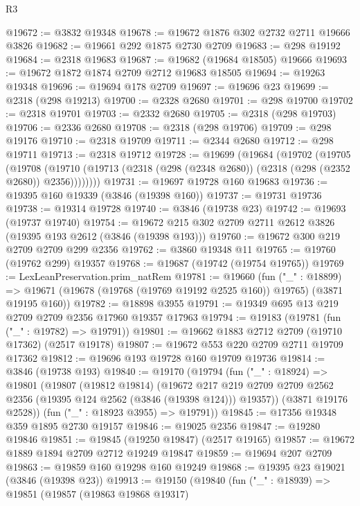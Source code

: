 \begin{lexlean}{R3}
\begin{coremodule}
@19672 := @3832 @19348
@19678 := @19672 @1876 @302 @2732 @2711 @19666 @3826
@19682 := @19661 @292 @1875 @2730 @2709
@19683 := @298 @19192
@19684 := @2318 @19683
@19687 := @19682 (@19684 @18505) @19666
@19693 := @19672 @1872 @1874 @2709 @2712 @19683 @18505
@19694 := @19263 @19348
@19696 := @19694 @178 @2709
@19697 := @19696 @23
@19699 := @2318 (@298 @19213)
@19700 := @2328 @2680
@19701 := @298 @19700
@19702 := @2318 @19701
@19703 := @2332 @2680
@19705 := @2318 (@298 @19703)
@19706 := @2336 @2680
@19708 := @2318 (@298 @19706)
@19709 := @298 @19176
@19710 := @2318 @19709
@19711 := @2344 @2680
@19712 := @298 @19711
@19713 := @2318 @19712
@19728 := @19699
    (@19684
      (@19702
        (@19705
          (@19708
            (@19710 (@19713 (@2318 (@298 (@2348 @2680)) (@2318 (@298 (@2352 @2680)) @2356))))))))
@19731 := @19697 @19728 @160 @19683
@19736 := @19395 @160 @19339 (@3846 (@19398 @160))
@19737 := @19731 @19736
@19738 := @19314 @19728
@19740 := @3846 (@19738 @23)
@19742 := @19693 (@19737 @19740)
@19754 := @19672 @215 @302 @2709 @2711 @2612 @3826 (@19395 @193 @2612 (@3846 (@19398 @193)))
@19760 := @19672 @300 @219 @2709 @2709 @299 @2356
@19762 := @3860 @19348 @11
@19765 := @19760 (@19762 @299) @19357
@19768 := @19687 (@19742 (@19754 @19765))
@19769 := LexLeanPreservation.prim_natRem
@19781 := @19660
    (fun ("_" : @18899) =>
    @19671 (@19678 (@19768 (@19769 @19192 @2525 @160)) @19765) (@3871 @19195 @160))
@19782 := @18898 @3955
@19791 := @19349 @695 @13 @219 @2709 @2709 @2356 @17960 @19357 @17963
@19794 := @19183 (@19781 (fun ("_" : @19782) => @19791))
@19801 := @19662 @1883 @2712 @2709 (@19710 @17362) (@2517 @19178)
@19807 := @19672 @553 @220 @2709 @2711 @19709 @17362
@19812 := @19696 @193 @19728 @160 @19709 @19736
@19814 := @3846 (@19738 @193)
@19840 := @19170
    (@19794
      (fun ("_" : @18924) =>
      @19801
        (@19807
          (@19812 @19814)
          (@19672
            @217
            @219
            @2709
            @2709
            @2562
            @2356
            (@19395 @124 @2562 (@3846 (@19398 @124)))
            @19357))
        (@3871 @19176 @2528))
      (fun ("_" : @18923 @3955) => @19791))
@19845 := @17356 @19348 @359 @1895 @2730 @19157
@19846 := @19025 @2356
@19847 := @19280 @19846
@19851 := @19845 (@19250 @19847) (@2517 @19165)
@19857 := @19672 @1889 @1894 @2709 @2712 @19249 @19847
@19859 := @19694 @207 @2709
@19863 := @19859 @160 @19298 @160 @19249
@19868 := @19395 @23 @19021 (@3846 (@19398 @23))
@19913 := @19150
    (@19840
      (fun ("_" : @18939) =>
      @19851
        (@19857
          (@19863 @19868 @19317)

\end{coremodule}
\end{lexlean}
